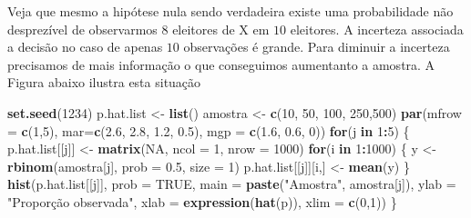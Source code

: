 \documentclass[10pt,a4paper]{book}
\newenvironment{Shaded}{\begin{snugshade}}{\end{snugshade}}
\newcommand{\KeywordTok}[1]{\textcolor[rgb]{0.13,0.29,0.53}{\textbf{#1}}}
\newcommand{\DataTypeTok}[1]{\textcolor[rgb]{0.13,0.29,0.53}{#1}}
\newcommand{\DecValTok}[1]{\textcolor[rgb]{0.00,0.00,0.81}{#1}}
\newcommand{\FloatTok}[1]{\textcolor[rgb]{0.00,0.00,0.81}{#1}}
\newcommand{\StringTok}[1]{\textcolor[rgb]{0.31,0.60,0.02}{#1}}
\newcommand{\OtherTok}[1]{\textcolor[rgb]{0.56,0.35,0.01}{#1}}
\newcommand{\ControlFlowTok}[1]{\textcolor[rgb]{0.13,0.29,0.53}{\textbf{#1}}}
\newcommand{\OperatorTok}[1]{\textcolor[rgb]{0.81,0.36,0.00}{\textbf{#1}}}
\newcommand{\NormalTok}[1]{#1}
\begin{document}
Veja que mesmo a hipótese nula sendo verdadeira existe uma probabilidade
não desprezível de observarmos \(8\) eleitores de X em \(10\) eleitores.
A incerteza associada a decisão no caso de apenas \(10\) observações é
grande. Para diminuir a incerteza precisamos de mais informação o que
conseguimos aumentanto a amostra. A Figura abaixo ilustra esta situação

\begin{Shaded}
\begin{Highlighting}[]
\KeywordTok{set.seed}\NormalTok{(}\DecValTok{1234}\NormalTok{)}
\NormalTok{p.hat.list <-}\StringTok{ }\KeywordTok{list}\NormalTok{()}
\NormalTok{amostra <-}\StringTok{ }\KeywordTok{c}\NormalTok{(}\DecValTok{10}\NormalTok{, }\DecValTok{50}\NormalTok{, }\DecValTok{100}\NormalTok{, }\DecValTok{250}\NormalTok{,}\DecValTok{500}\NormalTok{)}
\KeywordTok{par}\NormalTok{(}\DataTypeTok{mfrow =} \KeywordTok{c}\NormalTok{(}\DecValTok{1}\NormalTok{,}\DecValTok{5}\NormalTok{), }\DataTypeTok{mar=}\KeywordTok{c}\NormalTok{(}\FloatTok{2.6}\NormalTok{, }\FloatTok{2.8}\NormalTok{, }\FloatTok{1.2}\NormalTok{, }\FloatTok{0.5}\NormalTok{), }\DataTypeTok{mgp =} \KeywordTok{c}\NormalTok{(}\FloatTok{1.6}\NormalTok{, }\FloatTok{0.6}\NormalTok{, }\DecValTok{0}\NormalTok{))}
\ControlFlowTok{for}\NormalTok{(j }\ControlFlowTok{in} \DecValTok{1}\OperatorTok{:}\DecValTok{5}\NormalTok{) \{}
\NormalTok{  p.hat.list[[j]] <-}\StringTok{ }\KeywordTok{matrix}\NormalTok{(}\OtherTok{NA}\NormalTok{, }\DataTypeTok{ncol =} \DecValTok{1}\NormalTok{, }\DataTypeTok{nrow =} \DecValTok{1000}\NormalTok{)}
  \ControlFlowTok{for}\NormalTok{(i }\ControlFlowTok{in} \DecValTok{1}\OperatorTok{:}\DecValTok{1000}\NormalTok{) \{}
\NormalTok{  y <-}\StringTok{ }\KeywordTok{rbinom}\NormalTok{(amostra[j], }\DataTypeTok{prob =} \FloatTok{0.5}\NormalTok{, }\DataTypeTok{size =} \DecValTok{1}\NormalTok{)}
\NormalTok{  p.hat.list[[j]][i,] <-}\StringTok{ }\KeywordTok{mean}\NormalTok{(y)}
\NormalTok{  \}}
\KeywordTok{hist}\NormalTok{(p.hat.list[[j]], }\DataTypeTok{prob =} \OtherTok{TRUE}\NormalTok{, }\DataTypeTok{main =} \KeywordTok{paste}\NormalTok{(}\StringTok{"Amostra"}\NormalTok{, amostra[j]), }
     \DataTypeTok{ylab =} \StringTok{"Proporção observada"}\NormalTok{,}
     \DataTypeTok{xlab =} \KeywordTok{expression}\NormalTok{(}\KeywordTok{hat}\NormalTok{(p)), }\DataTypeTok{xlim =} \KeywordTok{c}\NormalTok{(}\DecValTok{0}\NormalTok{,}\DecValTok{1}\NormalTok{))}
\NormalTok{\}}
\end{Highlighting}
\end{Shaded}
\end{document}
